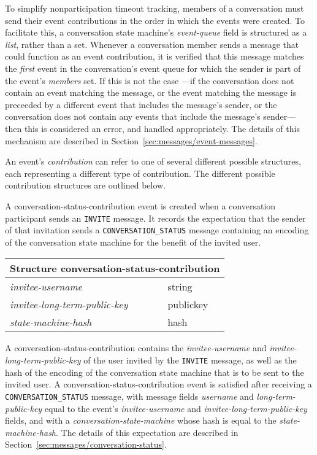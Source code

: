 \documentclass{article}
\def\message#1{\texttt{#1}}
\def\field#1{\textit{#1}}
\def\smfield#1{\textsl{#1}}
\def\type#1{\textsf{#1}}
\newenvironment{struct}[1]{
\newcommand{\structfield}[2]{
\smfield{##1} & \type{##2} \\
\hline
}
\par
\vspace{-\medskipamount}
\hspace{2em minus 2em}\begin{tabular}{|l|l|}
\hline
\multicolumn{2}{|c|}{Structure \type{#1}} \\
\hline
\hline
}{
\end{tabular}
\vspace{-\medskipamount}
\par
}
\begin{document}
To simplify nonparticipation timeout tracking, members of a conversation must send their event contributions in the order in which the events were created.
To facilitate this, a conversation state machine's \smfield{event-queue} field is structured as a \emph{list}, rather than a set.
Whenever a conversation member sends a message that could function as an event contribution, it is verified that this message matches the \emph{first} event in the conversation's event queue for which the sender is part of the event's \smfield{members} set.
If this is not the case ---if the conversation does not contain an event matching the message, or the event matching the message is preceeded by a different event that includes the message's sender, or the conversation does not contain any events that include the message's sender--- then this is considered an error, and handled appropriately.
The details of this mechanism are described in Section~\ref{sec:messages/event-messages}.

An event's \smfield{contribution} can refer to one of several different possible structures, each representing a different type of contribution.
The different possible contribution structures are outlined below.


A \type{conversation-status-contribution} event is created when a conversation participant sends an \message{INVITE} message.
It records the expectation that the sender of that invitation sends a \message{CONVERSATION\_STATUS} message containing an encoding of the conversation state machine for the benefit of the invited user.
\begin{struct}{conversation-status-contribution}
\structfield{invitee-username}{string}
\structfield{invitee-long-term-public-key}{publickey}
\structfield{state-machine-hash}{hash}
\end{struct}
A \type{conversation-status-contribution} contains the \smfield{invitee-username} and \smfield{invitee-long-term-public-key} of the user invited by the \message{INVITE} message, as well as the hash of the encoding of the conversation state machine that is to be sent to the invited user.
A \type{conversation-status-contribution} event is satisfied after receiving a \message{CONVERSATION\_STATUS} message, with message fields \field{username} and \field{long-term-public-key} equal to the event's \smfield{invitee-username} and \smfield{invitee-long-term-public-key} fields, and with a \field{conversation-state-machine} whose hash is equal to the \smfield{state-machine-hash}.
The details of this expectation are described in Section~\ref{sec:messages/conversation-status}.
\end{document}
